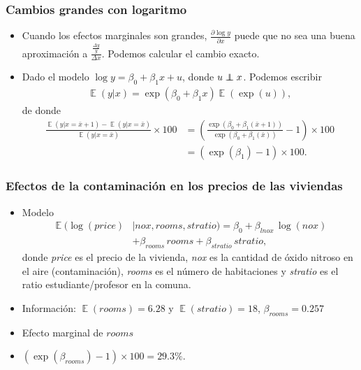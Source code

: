 \documentclass[t, compress, spanish, aspectratio=169]{beamer}
\DeclareMathOperator{\E}{\mathbb{E}}
\newcommand\independent{\protect\mathpalette{\protect\independenT}{\perp}}
\def\independenT#1#2{\mathrel{\rlap{$#1#2$}\mkern2mu{#1#2}}}
\begin{document}
    \begin{frame}
        \frametitle{Cambios grandes con logaritmo}
        \begin{itemize}
            \item <1-> Cuando los efectos marginales son grandes, $\frac{\partial \log{y}}{\partial x}$ puede que no sea una buena aproximaci\'on a $\frac{\frac{\Delta y}{y}}{\Delta x}$. Podemos calcular el cambio exacto.
            \item <2-> Dado el modelo $\log y = \beta_0+\beta_1 x + u$, donde $u \independent x$. Podemos escribir
            \begin{align*}
            \E(y|x) = \exp(\beta_0+\beta_1 x) \E(\exp(u)),
            \end{align*}
            de donde
            \small
            \begin{align*}
            \frac{\E(y|x=\bar x+1)-\E(y|x=\bar x)}{\E(y|x=\bar x)}\times 100& = \left(\frac{\exp(\beta_0+\beta_1 (\bar x+1))}{\exp(\beta_0+\beta_1 (\bar x))}-1\right) \times 100\\
            &= (\exp(\beta_1)-1) \times 100.
            \end{align*}
        \end{itemize}
    \end{frame}
    \begin{frame}
        \frametitle{Efectos de la contaminaci\'on en los precios de las viviendas}
        \begin{itemize}
            \item  Modelo
            \begin{align*}
            \E(\log(price)&|nox, rooms, stratio)   = \beta_0 +\beta_{lnox} \,\log(nox) \\
            &+\beta_{rooms}\, rooms + \beta_{stratio} \,stratio,
            \end{align*}
            donde \emph{price} es el precio de la vivienda, \emph{nox} es la cantidad de \'oxido nitroso en el aire (contaminaci\'on), \emph{rooms} es el n\'umero de habitaciones y \emph{stratio} es el ratio estudiante/profesor en la comuna.
            \item Informaci\'on: $\E(rooms)=6.28$ y $\E(stratio)=18$, $\beta_{rooms}=0.257$ 
            \item  Efecto marginal de $rooms$
            \item  [] $(\exp(\beta_{rooms})-1) \times 100= 29.3\%$.
        \end{itemize}
    \end{frame}
%
          
\end{document}
